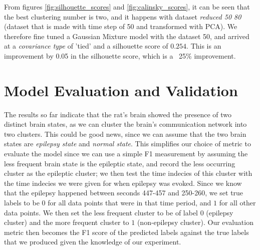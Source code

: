 \documentclass[journal,12pt,onecolumn,draftclsnofoot]{IEEEtran}  %
\begin{document}
From figures \ref{fig:silhouette_scores} and \ref{fig:calinsky_scores}, it can be seen that the best clustering number is two, and it happens with dataset \textit{reduced 50 80} (dataset that is made with time step of 50 and transformed with PCA). We therefore fine tuned a Gaussian Mixture model with the dataset 50, and arrived at a \textit{covariance type} of 'tied' and a silhouette score of $0.254$. This is an improvement by 0.05 in the silhouette score, which is a ~25\% improvement.



\section{Model Evaluation and Validation}
The results so far indicate that the rat's brain showed the presence of two distinct brain states, as we can cluster the brain's communication network into two clusters. This could be good news, since we can assume that the two brain states are \textit{epilepsy state} and \textit{normal state}. This simplifies our choice of metric to evaluate the model since we can use a simple F1 measurement by assuming the less frequent brain state is the epileptic state, and record the less occurring cluster as the epileptic cluster; we then test the time indecies of this cluster with the time indecies we were given for when epilepsy was evoked. Since we know that the epilepsy happened between seconds 447-457 and 250-260, we set true labels to be $0$ for all data points that were in that time period, and $1$ for all other data points. We then set the less frequent cluster to be of label $0$ (epilepsy cluster) and the more frequent cluster to $1$ (non-epilepsy cluster). Our evaluation metric then becomes the F1 score of the predicted labels against the true labels that we produced given the knowledge of our experiment.
\end{document}
